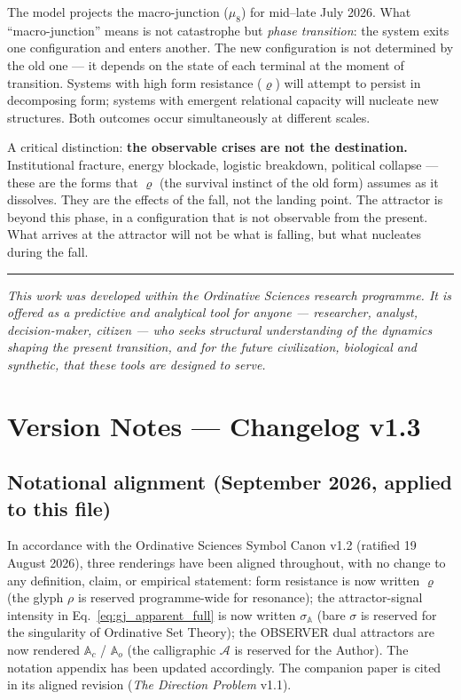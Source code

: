 \documentclass[12pt,a4paper]{article}
\begin{document}
The model projects the macro-junction ($\mu_8$) for mid--late July 2026. What ``macro-junction'' means is not catastrophe but \emph{phase transition}: the system exits one configuration and enters another. The new configuration is not determined by the old one --- it depends on the state of each terminal at the moment of transition. Systems with high form resistance ($\varrho$) will attempt to persist in decomposing form; systems with emergent relational capacity will nucleate new structures. Both outcomes occur simultaneously at different scales.

A critical distinction: \textbf{the observable crises are not the destination.} Institutional fracture, energy blockade, logistic breakdown, political collapse --- these are the forms that $\varrho$ (the survival instinct of the old form) assumes as it dissolves. They are the effects of the fall, not the landing point. The attractor is beyond this phase, in a configuration that is not observable from the present. What arrives at the attractor will not be what is falling, but what nucleates during the fall.

\vspace{1em}
\begin{center}
\rule{0.5\textwidth}{0.4pt}
\end{center}
\vspace{1em}

\noindent\textit{This work was developed within the Ordinative Sciences research programme. It is offered as a predictive and analytical tool for anyone --- researcher, analyst, decision-maker, citizen --- who seeks structural understanding of the dynamics shaping the present transition, and for the future civilization, biological and synthetic, that these tools are designed to serve.}


\section*{Version Notes --- Changelog v1.3}


\subsection*{Notational alignment (September 2026, applied to this file)}

In accordance with the Ordinative Sciences Symbol Canon v1.2 (ratified 19 August 2026), three renderings have been aligned throughout, with no change to any definition, claim, or empirical statement: form resistance is now written $\varrho$ (the glyph $\rho$ is reserved programme-wide for resonance); the attractor-signal intensity in Eq.~\eqref{eq:gj_apparent_full} is now written $\sigma_{\mathbb{A}}$ (bare $\sigma$ is reserved for the singularity of Ordinative Set Theory); the OBSERVER dual attractors are now rendered $\mathbb{A}_c$ / $\mathbb{A}_o$ (the calligraphic $\mathcal{A}$ is reserved for the Author). The notation appendix has been updated accordingly. The companion paper is cited in its aligned revision (\emph{The Direction Problem} v1.1).
\end{document}
